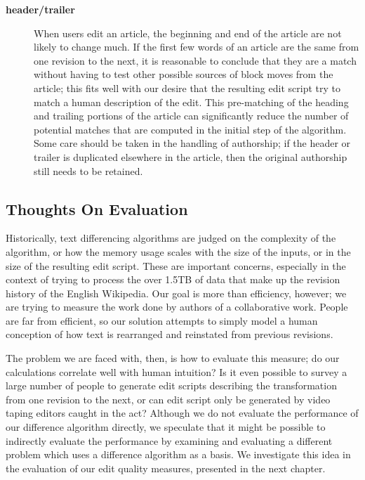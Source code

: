\begin{description}
\item[\textbf{header/trailer}] When users edit an article, the beginning
    and end of the article are not likely to change much.
    If the first few words of an article are the same from one revision to
    the next, it is reasonable to conclude that they are a match
    without having to test other possible sources of block moves
    from the article; this fits well with our desire that the resulting
    edit script try to match a human description of the edit.
    This pre-matching of the heading and trailing portions of the
    article can significantly reduce the number of potential matches
    that are computed in the initial step of the algorithm.
    Some care should be taken in the handling of authorship;
    if the header or trailer is duplicated elsewhere in the article,
    then the original authorship still needs to be retained.

\end{description}


\subsection{Thoughts On Evaluation}

Historically, text differencing algorithms are judged
on the complexity of the algorithm, or how the memory
usage scales with the size of the inputs, or in the
size of the resulting edit script.
These are important concerns, especially in the context of
trying to process the over 1.5TB of data that make up the
revision history of the English Wikipedia.
Our goal is more than efficiency, however; we are trying
to measure the work done by authors of a collaborative work.
People are far from efficient, so our solution attempts to
simply model a human conception of how text is rearranged
and reinstated from previous revisions.

The problem we are faced with, then, is how to evaluate
this measure; do our calculations correlate well with
human intuition?
Is it even possible to survey a large number of people
to generate edit scripts describing the transformation from
one revision to the next, or can edit script only be generated
by video taping editors caught in the act?
Although we do not evaluate the performance of our difference
algorithm directly, we speculate that it might be possible to
indirectly evaluate the performance by examining and evaluating
a different problem which uses a difference algorithm as a basis.
We investigate this idea in the evaluation of our edit quality
measures, presented in the next chapter.

